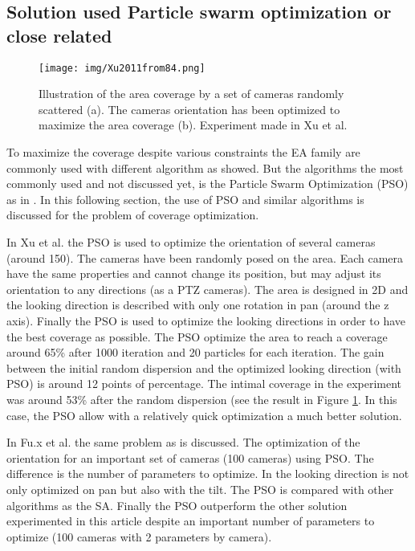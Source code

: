 \subsection{Solution used Particle swarm optimization or close related}	

\begin{figure}[t!]
	\center
{}
   \texttt{[image: img/Xu2011from84.png]}
  \caption{Illustration of  the  area coverage by a set of cameras randomly scattered (a). The cameras orientation has been optimized to maximize the  area coverage (b). Experiment made in Xu et al. \citep{84*xu2011}}\label{fig:Coverage84}
  \endminipage\hfill
\end{figure} 

To maximize the coverage despite various constraints the EA family are commonly used with different algorithm as showed. But the algorithms the most commonly used and not discussed yet, is the Particle Swarm Optimization (PSO) as in \cite{84*xu2011,8*zhou2011,33*reddy2012,143*maji2015,193*fu2014,194*fu2010,200*kulkarni2011}. In this following section, the use of PSO and similar algorithms is discussed for the problem of coverage optimization. 

 In Xu et al. \cite{84*xu2011} the PSO is used to optimize the orientation of several cameras (around 150).
The cameras have been randomly posed on the area. Each camera have the same properties and cannot change its position, but may adjust its orientation to any directions (as a PTZ cameras). The area is designed in 2D and the looking direction is described with only one rotation in pan (around  the z axis).  
Finally the PSO is used to optimize the looking directions in order to have the best coverage as possible. The PSO optimize the area to reach a coverage around 65\% after 1000 iteration and 20 particles for each iteration.
The gain between the initial random dispersion  and the optimized looking direction (with PSO) is  around 12 points of percentage. The intimal coverage in the experiment was around 53\% after the random dispersion (see the result in Figure \ref{fig:Coverage84}. In this case, the PSO allow with a relatively quick optimization a much better solution.

In Fu.x et al. \cite{194*fu2010} the same problem as \cite{84*xu2011} is discussed. The optimization of the orientation for an important set of cameras (100 cameras) using PSO. The difference is the number of parameters to optimize. In \cite{194*fu2010} the looking direction is not only optimized on pan but also with the tilt.  
The PSO is compared with other algorithms as the SA. Finally the PSO outperform the other solution experimented in this article despite an important number of parameters to optimize (100 cameras with 2 parameters by camera).

